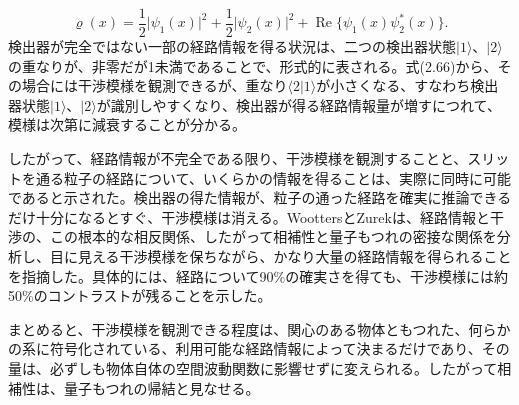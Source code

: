 \hypertarget{srcpage:65}{}\label{srcpage:65}
\begin{equation}\varrho(x)=\frac12\lvert\psi_1(x)\rvert^2+\frac12\lvert\psi_2(x)\rvert^2+\operatorname{Re}\{\psi_1(x)\psi_2^*(x)\}.\tag{2.69}\end{equation}
検出器が完全ではない一部の経路情報を得る状況は、二つの検出器状態$\lvert1\rangle$、$\lvert2\rangle$の重なりが、非零だが1未満であることで、形式的に表される。式(2.66)から、その場合には干渉模様を観測できるが、重なり$\langle2\vert1\rangle$が小さくなる、すなわち検出器状態$\lvert1\rangle$、$\lvert2\rangle$が識別しやすくなり、検出器が得る経路情報量が増すにつれて、模様は次第に減衰することが分かる。

したがって、経路情報が不完全である限り、干渉模様を観測することと、スリットを通る粒子の経路について、いくらかの情報を得ることは、実際に同時に可能であると示された。検出器の得た情報が、粒子の通った経路を確実に推論できるだけ十分になるとすぐ、干渉模様は消える。WoottersとZurek\cite{ref074}は、経路情報と干渉の、この根本的な相反関係、したがって相補性と量子もつれの密接な関係を分析し、目に見える干渉模様を保ちながら、かなり大量の経路情報を得られることを指摘した。具体的には、経路について90\%の確実さを得ても、干渉模様には約50\%のコントラストが残ることを示した。

まとめると、干渉模様を観測できる程度は、関心のある物体ともつれた、何らかの系に符号化されている、利用可能な経路情報によって決まるだけであり、その量は、必ずしも物体自体の空間波動関数に影響せずに変えられる。したがって相補性は、量子もつれの帰結と見なせる。
